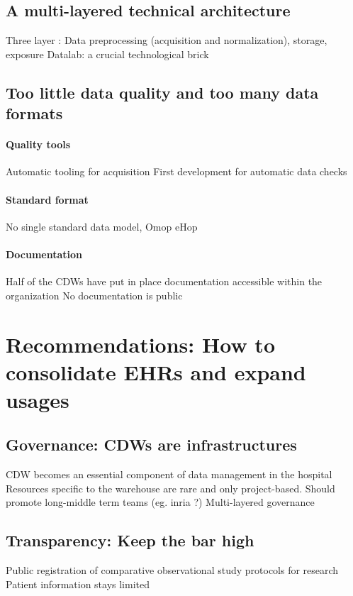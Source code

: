 \documentclass{report}
\begin{document}
\subsection{A multi-layered technical
  architecture}\label{subsec:cdw:results:architecture} Three layer : Data
preprocessing (acquisition and normalization), storage, exposure Datalab: a
crucial technological brick

\subsection{Too little data quality and too many data
  formats}\label{subsec:cdw:results:data_quality}
\paragraph{Quality tools}
Automatic tooling for acquisition
First development for automatic data checks
\paragraph{Standard format}
No single standard data model,
Omop
eHop
\paragraph{Documentation}
Half of the CDWs have put in place documentation accessible within the organization
No documentation is public

\section{Recommendations: How to consolidate EHRs and expand
  usages}\label{sec:cdw:recommendations}

\subsection{Governance: CDWs are
  infrastructures}\label{subsec:cdw:recommendations:governance}

CDW becomes an essential component of data management in the hospital Resources
specific to the warehouse are rare and only project-based. Should promote
long-middle term teams (eg. inria ?) Multi-layered governance

\subsection{Transparency: Keep the bar
  high}\label{subsec:cdw:recommendations:transparency} Public registration of
comparative observational study protocols for research Patient information stays
limited
\end{document}
